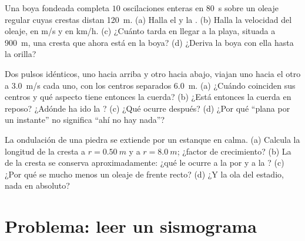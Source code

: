 \begin{exercise}[$\star\star\star$]\label{exo:g12:mechanical-waves:13}
Una boya fondeada completa $10$ oscilaciones enteras en \qty{80}{s}
sobre un oleaje regular cuyas crestas distan \qty{120}{m}. (a) Halla el
 y la . (b) Halla la velocidad del oleaje, en
\unit{m/s} y en \unit{km/h}. (c) ¿Cuánto tarda en llegar a la playa,
situada a \qty{900}{m}, una cresta que ahora está en la boya? (d) ¿Deriva
la boya con ella hasta la orilla?
\end{exercise}

\begin{exercise}[$\star\star\star$]\label{exo:g12:mechanical-waves:14}
Dos pulsos idénticos, uno hacia arriba y otro hacia abajo, viajan uno
hacia el otro a \qty{3.0}{m/s} cada uno, con los centros separados
\qty{6.0}{m}. (a) ¿Cuándo coinciden sus centros y qué aspecto tiene
entonces la cuerda? (b) ¿Está entonces la cuerda en reposo? ¿Adónde ha
ido la ? (c) ¿Qué ocurre después? (d) ¿Por qué ``plana por un
instante'' no significa ``ahí no hay nada''?
\end{exercise}

\begin{exercise}[$\star\star\star$]\label{exo:g12:mechanical-waves:15}
La ondulación de una piedra se extiende por un estanque en calma. (a)
Calcula la longitud de la cresta a $r = \qty{0.50}{m}$ y a
$r = \qty{8.0}{m}$; ¿factor de crecimiento? (b) La  de la cresta
se conserva aproximadamente: ¿qué le ocurre a la  por  y a
la ? (c) ¿Por qué se  mucho menos un oleaje de frente
recto? (d) ¿Y la ola del estadio, nada en absoluto?
\end{exercise}

\section{Problema: leer un sismograma}

